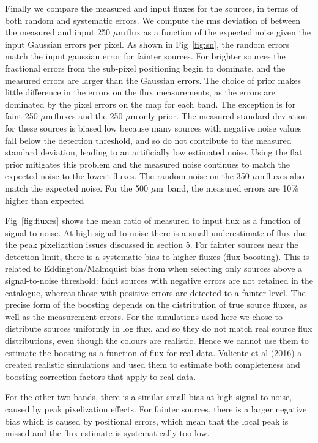 \documentclass[useAMS,usenatbib]{mn2e}
\def\mic{ $\mu $m\,}
\begin{document}
Finally we compare the measured and input fluxes for the sources, in
terms of both random and systematic errors. We compute the rms
deviation of between the measured and input 250\mic flux as a function
of the expected noise given the input Gaussian errors per pixel.  As
shown in Fig~\ref{fig:sn}, the random errors match the input gaussian
error for fainter sources. For brighter sources the fractional errors
from the sub-pixel positioning begin to dominate, and the measured
errors are larger than the Gaussian errors.  The choice of prior makes
little difference in the errors on the flux measurements, as the
errors are dominated by the pixel errors on the map for each band. The
exception is for faint 250\mic fluxes and the 250\mic only prior. The
measured standard deviation for these sources is biased low because
many sources with negative noise values fall below the detection
threshold, and so do not contribute to the measured standard
deviation, leading to an artificially low estimated noise.  Using the
flat prior mitigates this problem and the measured noise continues to
match the expected noise to the lowest fluxes.  The random noise on
the 350\mic fluxes also match the expected noise. For the 500\mic
band, the measured errors are 10\%  higher than expected

Fig~\ref{fig:fluxes} shows the mean ratio of measured to input flux as
a function of signal to noise. At high signal to noise there is a
small underestimate of flux due the peak pixelization issues discussed
in section 5.  For fainter sources near the detection limit, there is
a systematic bias to higher fluxes (flux boosting). This is related to
Eddington/Malmquist bias from when selecting only sources above a
signal-to-noise threshold: faint sources with negative errors are not
retained in the catalogue, whereas those with positive errors are
detected to a fainter level.  The precise form of the boosting depends
on the distribution of true source fluxes, as well as the measurement
errors.  For the simulations used here we chose to distribute sources
uniformly in log flux, and so they do not match real source flux
distributions, even though the colours are realistic. Hence we cannot
use them to estimate the boosting as a function of flux for real
data. Valiente et al (2016) a created realistic simulations and used
them to estimate both completeness and boosting correction factors
that apply to real data.

For the other two bands, there is a similar small bias at high signal
to noise, caused by peak pixelization effects. For fainter sources,
there is a larger negative bias which is caused by positional errors,
which mean that the local peak is missed and the flux estimate is
systematically too low.
\end{document}
